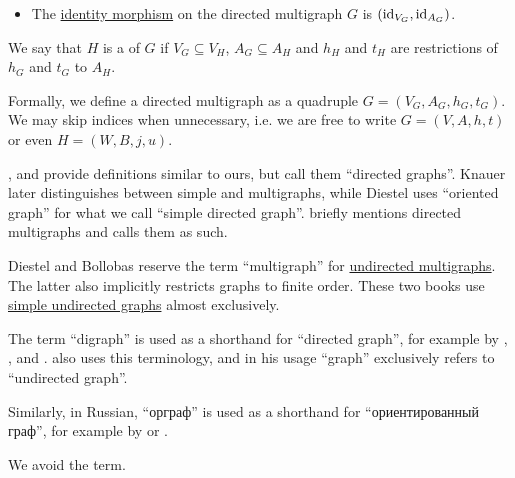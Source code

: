 \begin{definition}
\begin{thmenum}[resume=def:directed_multigraph]
\begin{itemize}
      \item The \hyperref[def:category/identity]{identity morphism} on the directed multigraph \( G \) is \( (\operatorname{id}_{V_G}, \operatorname{id}_{A_G}) \).
    \end{itemize}

     We say that \( H \) is a  of \( G \) if \( V_G \subseteq V_H \), \( A_G \subseteq A_H \) and \( h_H \) and \( t_H \) are restrictions of \( h_G \) and \( t_G \) to \( A_H \).
  \end{thmenum}
\end{definition}
\begin{comments}
  \item Formally, we define a directed multigraph as a quadruple \( G = (V_G, A_G, h_G, t_G) \). We may skip indices when unnecessary, i.e. we are free to write \( G = (V, A, h, t) \) or even \( H = (W, B, j, u) \).

  \item {},  and  provide definitions similar to ours, but call them \enquote{directed graphs}. Knauer later distinguishes between simple and multigraphs, while Diestel uses \enquote{oriented graph} for what we call \enquote{simple directed graph}.  briefly mentions directed multigraphs and calls them as such.

  Diestel and Bollobas reserve the term \enquote{multigraph} for \hyperref[def:undirected_multigraph]{undirected multigraphs}. The latter also implicitly restricts graphs to finite order. These two books use \hyperref[def:undirected_graph]{simple undirected graphs} almost exclusively.
\end{comments}

\begin{remark}\label{rem:digraph}
  The term \enquote{digraph} is used as a shorthand for \enquote{directed graph}, for example by , ,  and .  also uses this terminology, and in his usage \enquote{graph} exclusively refers to \enquote{undirected graph}.

  Similarly, in Russian, \enquote{орграф} is used as a shorthand for \enquote{ориентированный граф}, for example by  or .

  We avoid the term.
\end{remark}

